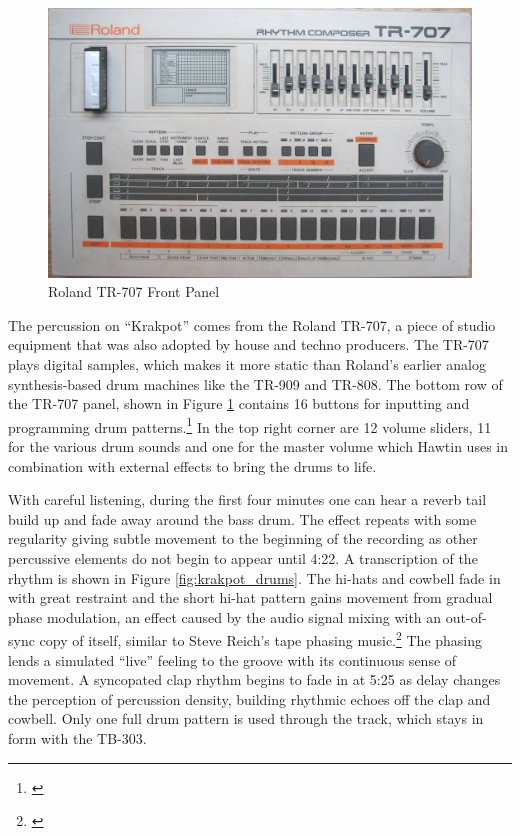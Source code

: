 \documentclass[12pt,twoside]{reedthesis}
\begin{document}
\begin{figure}[htbp]
	\begin{centering}
		\includegraphics[width=5in]{./Images/Roland_TR-707_edit}
		\caption{Roland TR-707 Front Panel}
		\label{fig:TR707}
	\end{centering}
\end{figure}

The percussion on ``Krakpot'' comes from the Roland TR-707, a piece of studio equipment that was also adopted by house and techno producers. The TR-707 plays digital samples, which makes it more static than Roland's earlier analog synthesis-based drum machines like the TR-909 and TR-808. The bottom row of the TR-707 panel, shown in Figure \ref{fig:TR707} contains 16 buttons for inputting and programming drum patterns.\footnote{\cite{speculosDrumMachineRoland2008}} In the top right corner are 12 volume sliders, 11 for the various drum sounds and one for the master volume which Hawtin uses in combination with external effects to bring the drums to life.

With careful listening, during the first four minutes one can hear a reverb tail build up and fade away around the bass drum. The effect repeats with some regularity giving subtle movement to the beginning of the recording as other percussive elements do not begin to appear until 4:22. A transcription of the rhythm is shown in Figure \ref{fig:krakpot_drums}. The hi-hats and cowbell fade in with great restraint and the short hi-hat pattern gains movement from gradual phase modulation, an effect caused by the audio signal mixing with an out-of-sync copy of itself, similar to Steve Reich's tape phasing music.\footnote{\cite{huizengaFiftyYearsSteve2015}} The phasing lends a simulated ``live'' feeling to the groove with its continuous sense of movement. A syncopated clap rhythm begins to fade in at 5:25 as delay changes the perception of percussion density, building rhythmic echoes off the clap and cowbell. Only one full drum pattern is used through the track, which stays in form with the TB-303.
\end{document}
